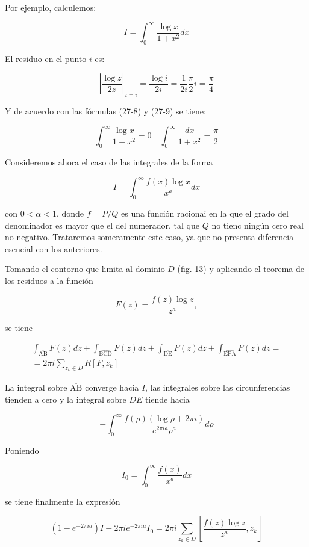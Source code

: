 \documentclass[10pt]{article}
\theoremstyle{plain}
\theoremstyle{definition}
\theoremstyle{remark}
\begin{document}
Por ejemplo, calculemos:

$$
I=\int_{0}^{\infty} \frac{\log x}{1+x^{2}} d x
$$

El residuo en el punto $i$ es:

$$
\left|\frac{\log z}{2 z}\right|_{z=i}=\frac{\log i}{2 i}=\frac{1}{2 i} \frac{\pi}{2} i=\frac{\pi}{4}
$$

Y de acuerdo con las fórmulas (27-8) y (27-9) se tiene:

$$
\int_{0}^{\infty} \frac{\log x}{1+x^{2}}=0 \quad \int_{0}^{\infty} \frac{d x}{1+x^{2}}=\frac{\pi}{2}
$$

Consideremos ahora el caso de las integrales de la forma


\begin{equation*}
I=\int_{0}^{\infty} \frac{f(x) \log x}{x^{a}} d x \tag{$27\cdot10$}
\end{equation*}


con $0<\alpha<1$, donde $f=P / Q$ es una función racionai en la que el grado del denominador es mayor que el del numerador, tal que $Q$ no tienc ningún cero real no negativo. Trataremos someramente este caso, ya que no presenta diferencia esencial con los anteriores.

Tomando el contorno que limita al dominio $D$ (fig. 13) y aplicando el teorema de los residuos a la función

$$
F(z)=\frac{f(z) \log z}{z^{a}},
$$

se tiene

$$
\begin{gathered}
\int_{\overline{\mathrm{AB}}} F(z) d z+\int_{\widehat{\mathrm{BCD}}} F(z) d z+\int_{\overline{\mathrm{DE}}} F(z) d z+\int_{\widehat{\mathrm{EFA}}} F(z) d z= \\
=2 \pi i \sum_{z_{k} \in D} R\left[F, z_{k}\right]
\end{gathered}
$$

La integral sobre $\overline{\mathrm{AB}}$ converge hacia $I$, las integrales sobre las circunferencias tienden a cero y la integral sobre $\overline{D E}$ tiende hacia

$$
-\int_{0}^{\infty} \frac{f(\rho)(\log \rho+2 \pi i)}{e^{2 \pi i a} \rho^{a}} d \rho
$$

Poniendo

$$
I_{0}=\int_{0}^{\infty} \frac{f(x)}{x^{a}} d x
$$

se tiene finalmente la expresión

$$
\left(1-e^{-2 \pi i a}\right) I-2 \pi i e^{-2 \pi i a} I_{0}=2 \pi i \sum_{z_{k} \in D}\left[\frac{f(z) \log z}{z^{a}}, z_{k}\right]
$$
\end{document}
